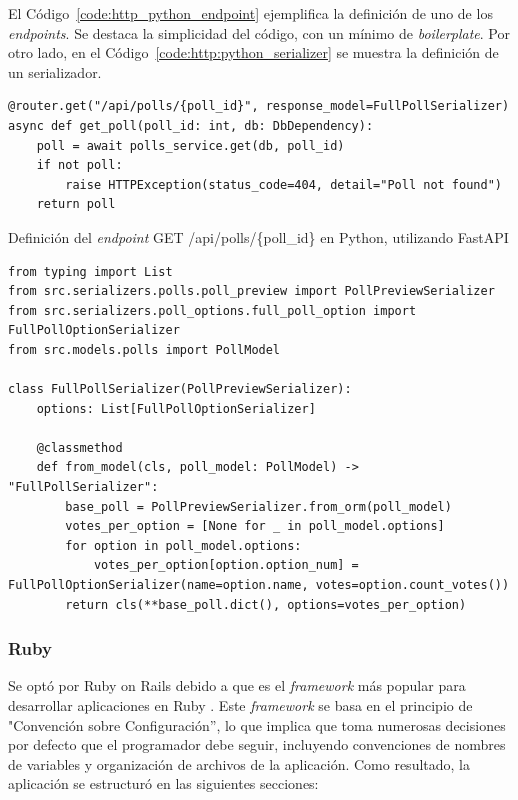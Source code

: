 \documentclass[11pt]{article}
\let\Oldsubsubsection\subsubsection
\renewcommand{\subsubsection}{\FloatBarrier\Oldsubsubsection}
\newcommand{\english}[1]{\textit{#1}}
\begin{document}
El Código~\ref{code:http_python_endpoint} ejemplifica la definición de uno de los \english{endpoints}. Se destaca la simplicidad del código, con un mínimo de \english{boilerplate}. Por otro lado, en el Código~\ref{code:http:python_serializer} se muestra la definición de un serializador.

\begin{listing}[h]
\begin{verbatim}
@router.get("/api/polls/{poll_id}", response_model=FullPollSerializer)
async def get_poll(poll_id: int, db: DbDependency):
    poll = await polls_service.get(db, poll_id)
    if not poll:
        raise HTTPException(status_code=404, detail="Poll not found")
    return poll
\end{verbatim}
\caption{Definición del \english{endpoint} GET /api/polls/\{poll\_id\} en Python, utilizando FastAPI}
\label{code:http_python_endpoint}
\end{listing}

\begin{listing}[h]
\begin{verbatim}
from typing import List
from src.serializers.polls.poll_preview import PollPreviewSerializer
from src.serializers.poll_options.full_poll_option import FullPollOptionSerializer
from src.models.polls import PollModel

class FullPollSerializer(PollPreviewSerializer):
    options: List[FullPollOptionSerializer]

    @classmethod
    def from_model(cls, poll_model: PollModel) -> "FullPollSerializer":
        base_poll = PollPreviewSerializer.from_orm(poll_model)
        votes_per_option = [None for _ in poll_model.options]
        for option in poll_model.options:
            votes_per_option[option.option_num] = FullPollOptionSerializer(name=option.name, votes=option.count_votes())
        return cls(**base_poll.dict(), options=votes_per_option)
\end{verbatim}
\caption{Definición de un Serializador en Python, utilizando \lstinline{pydantic}}
\label{code:http:python_serializer}
\end{listing}

\subsubsection{Ruby}

Se optó por Ruby on Rails debido a que es el \english{framework} más popular para desarrollar aplicaciones en Ruby \cite{http:ruby_top_100}. Este \english{framework} se basa en el principio de "Convención sobre Configuración'', lo que implica que toma numerosas decisiones por defecto que el programador debe seguir, incluyendo convenciones de nombres de variables y organización de archivos de la aplicación. Como resultado, la aplicación se estructuró en las siguientes secciones:
\end{document}
